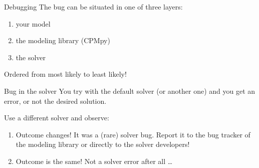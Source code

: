 \documentclass{cons-beamer}
\begin{document}
\begin{frame}{Debugging}
  The bug can be situated in one of three layers:
  \begin{enumerate}
    \item your model
    \item the modeling library (CPMpy)
    \item the solver
  \end{enumerate}
  \vfill

  Ordered from most likely to least likely!
\end{frame}

\begin{frame}{Bug in the solver}
  You try with the default solver (or another one) and you get an error, or not the desired solution.
  \vfill

  \large
  Use a different solver and observe:
  \normalsize 
  \vfill
  
  \begin{enumerate}
    \item Outcome changes! It was a (rare) solver bug. Report it to the bug tracker of the modeling library or directly to the solver developers!
          \vfill

    \item Outcome is the same! Not a solver error after all \dots
  \end{enumerate}
\end{frame}
\end{document}
